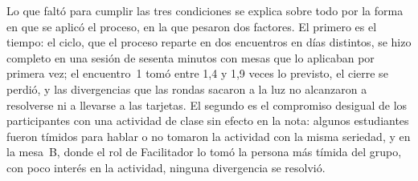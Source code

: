 \documentclass[12pt,letterpaper,oneside]{report}
\begin{document}
Lo que faltó para cumplir las tres condiciones se explica sobre todo por la
forma en que se aplicó el proceso, en la que pesaron dos factores. El primero es
el tiempo: el ciclo, que el proceso reparte en dos encuentros en días distintos,
se hizo completo en una sesión de sesenta minutos con mesas que lo aplicaban por
primera vez; el encuentro~1 tomó entre 1,4 y 1,9 veces lo previsto, el cierre se
perdió, y las divergencias que las rondas sacaron a la luz no alcanzaron a
resolverse ni a llevarse a las tarjetas. El segundo es el compromiso desigual de
los participantes con una actividad de clase sin efecto en la nota: algunos
estudiantes fueron tímidos para hablar o no tomaron la actividad con la misma
seriedad, y en la mesa~B, donde el rol de Facilitador lo tomó la persona más
tímida del grupo, con poco interés en la actividad, ninguna divergencia se
resolvió.
\end{document}
